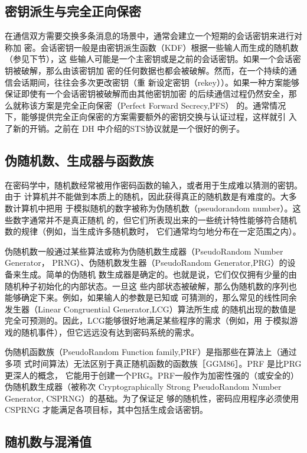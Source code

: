 \subsection{密钥派生与完全正向保密}
在通信双方需要交换多条消息的场景中，通常会建立一个短期的会话密钥来进行对称加
密。会话密钥一般是由密钥派生函数（KDF）根据一些输人而生成的随机数（参见下节），这
些输人可能是一个主密钥或是之前的会话密钥。如果一个会话密钥被破解，那么由该密钥加
密的任何数据也都会被破解。然而，在一个持续的通信会话期间，往往会多次更改密钥（重
新设定密钥（rekey））。如果一种方案能够保证即使有一个会话密钥被破解而由其他密钥加密
的后续通信过程仍然安全，那么就称该方案是完全正向保密（Perfect Forward Secrecy,PFS）
的。通常情况下，能够提供完全正向保密的方案需要额外的密钥交换与认证过程，这样就引
入了新的开销。之前在 DH 中介绍的STS协议就是一个很好的例子。

\subsection{伪随机数、生成器与函数族}
在密码学中，随机数经常被用作密码函数的输入，或者用于生成难以猜测的密钥。由于
计算机并不能做到本质上的随机，因此获得真正的随机数是有难度的。大多数计算机中把用
于模拟随机的数字被称为伪随机数（pseudorandom number）。这些数字通常并不是真正随机
的，但它们所表现出来的一些统计特性能够符合随机数的规律（例如，当生成许多随机数时，
它们通常均匀地分布在一定范围之内）。

伪随机数一般通过某些算法或称为伪随机数生成器（PseudoRandom Number Generator，
PRNG）、伪随机数发生器（PseudoRandom Generator,PRG）的设备来生成。简单的伪随机
数生成器是确定的。也就是说，它们仅仅拥有少量的由随机种子初始化的内部状态。一旦这
些内部状态被破解，那么伪随机数的序列也能够确定下来。例如，如果输人的参数是已知或
可猜测的，那么常见的线性同余发生器（Linear Congruential Generator,LCG）算法所生成
的随机出现的数值是完全可预测的。因此，LCG能够很好地满足某些程序的需求（例如，用
于模拟游戏的随机事件），但它远远没有达到密码系统的需求。

伪随机函数族（PseudoRandom Function family,PRF）是指那些在算法上（通过多项
式时间算法）无法区别于真正随机函数的函数族［GGM86］。PRF 是比PRG 更深人的概念，
它能用于创建一个PRG。PRF一般作为加密性强的（或安全的）伪随机数生成器（被称次
Cryptographically Strong PseudoRandom Number Generator, CSPRNG）的基础。为了保证足
够的随机性，密码应用程序必须使用CSPRNG 才能满足各项目标，其中包括生成会话密钥。

\subsection{随机数与混淆值}

